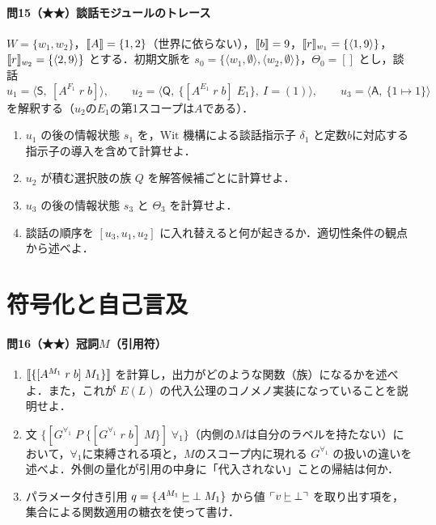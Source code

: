 \documentclass[../../main-detail.tex]{subfiles}
\begin{document}
\paragraph{問15（★★）談話モジュールのトレース}
$W = \{w_1, w_2\}$，$\llbracket A\rrbracket = \{1,2\}$（世界に依らない），$\llbracket b\rrbracket = 9$，$\llbracket r\rrbracket_{w_1} = \{\langle 1,9\rangle\}$，$\llbracket r\rrbracket_{w_2} = \{\langle 2,9\rangle\}$ とする．初期文脈を $s_0 = \{\langle w_1, \emptyset\rangle, \langle w_2, \emptyset\rangle\}$，$\Theta_0 = []$ とし，談話
\[
    u_1 = \langle\mathsf S,\ [A^{F_1}\; r\; b]\rangle,\qquad
    u_2 = \langle\mathsf Q,\ \{[A^{E_1}\;r\;b]\;E_1\},\ I=(1)\rangle,\qquad
    u_3 = \langle\mathsf A,\ \{1 \mapsto 1\}\rangle
\]
を解釈する（$u_2$の$E_1$の第1スコープは$A$である）．
\begin{enumerate}[label=(\alph*)]
    \item $u_1$ の後の情報状態 $s_1$ を，$\mathrm{Wit}$ 機構による談話指示子 $\delta_1$ と定数$b$に対応する指示子の導入を含めて計算せよ．
    \item $u_2$ が積む選択肢の族 $Q$ を解答候補ごとに計算せよ．
    \item $u_3$ の後の情報状態 $s_3$ と $\Theta_3$ を計算せよ．
    \item 談話の順序を $[u_3, u_1, u_2]$ に入れ替えると何が起きるか．適切性条件の観点から述べよ．
\end{enumerate}

\section{符号化と自己言及}

\paragraph{問16（★★）冠詞$M$（引用符）}
\begin{enumerate}[label=(\alph*)]
    \item $\llbracket \{[A^{M_1}\; r\; b]\; M_1\}\rrbracket$ を計算し，出力がどのような関数（族）になるかを述べよ．また，これが $E(L)$ の代入公理のコノメノ実装になっていることを説明せよ．
    \item 文 $\{[G^{\forall_1}\; P\; \{[G^{\forall_1}\; r\; b]\; M\}]\;\forall_1\}$（内側の$M$は自分のラベルを持たない）において，$\forall_1$に束縛される項と，$M$のスコープ内に現れる $G^{\forall_1}$ の扱いの違いを述べよ．外側の量化が引用の中身に「代入されない」ことの帰結は何か．
    \item パラメータ付き引用 $q = \{A^{M_1} \mathrel{\underline{\vdash}} \bot\; M_1\}$ から値 $\ulcorner v \mathrel{\underline{\vdash}} \bot \urcorner$ を取り出す項を，集合による関数適用の糖衣を使って書け．
\end{enumerate}
\end{document}

